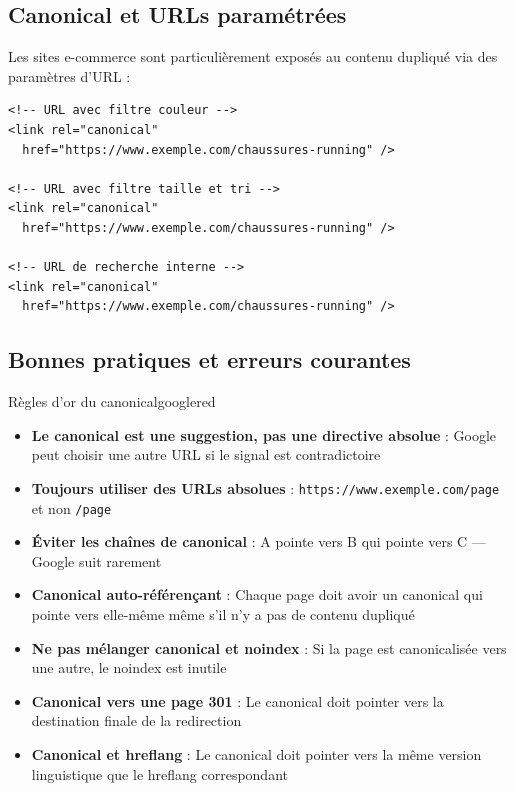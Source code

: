 \documentclass[12pt,a4paper,twoside]{report}
\newcommand{\important}[1]{\textbf{\textcolor{googlered}{#1}}}
\begin{document}
\subsection{Canonical et URLs paramétrées}

Les sites e-commerce sont particulièrement exposés au contenu dupliqué via des paramètres d'URL :

\begin{lstlisting}[style=htmlcode,caption={Gestion des paramètres de filtres e-commerce}]
<!-- URL avec filtre couleur -->
<link rel="canonical"
  href="https://www.exemple.com/chaussures-running" />

<!-- URL avec filtre taille et tri -->
<link rel="canonical"
  href="https://www.exemple.com/chaussures-running" />

<!-- URL de recherche interne -->
<link rel="canonical"
  href="https://www.exemple.com/chaussures-running" />
\end{lstlisting}

\subsection{Bonnes pratiques et erreurs courantes}

\begin{mybox}{Règles d'or du canonical}{googlered}
\begin{itemize}
    \item \important{Le canonical est une suggestion, pas une directive absolue} : Google peut choisir une autre URL si le signal est contradictoire
    \item \important{Toujours utiliser des URLs absolues} : \texttt{https://www.exemple.com/page} et non \texttt{/page}
    \item \important{Éviter les chaînes de canonical} : A pointe vers B qui pointe vers C — Google suit rarement
    \item \important{Canonical auto-référençant} : Chaque page doit avoir un canonical qui pointe vers elle-même même s'il n'y a pas de contenu dupliqué
    \item \important{Ne pas mélanger canonical et noindex} : Si la page est canonicalisée vers une autre, le noindex est inutile
    \item \important{Canonical vers une page 301} : Le canonical doit pointer vers la destination finale de la redirection
    \item \important{Canonical et hreflang} : Le canonical doit pointer vers la même version linguistique que le hreflang correspondant
\end{itemize}
\end{mybox}
\end{document}
